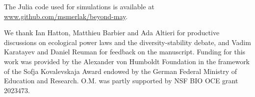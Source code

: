 \documentclass[
 prl,
 twocolumn,
 amsmath,
 amssymb,
 aps,
]{revtex4-2}
\begin{document}
\medskip

The Julia code used for simulations is available at \url{www.github.com/msmerlak/beyond-may}.

\medskip

\begin{acknowledgments}
We thank Ian Hatton, Matthieu Barbier and Ada Altieri for productive discussions on ecological power laws and the diversity-stability debate, and Vadim Karatayev and Daniel Reuman for feedback on the manuscript.
Funding for this work was provided by the Alexander von Humboldt Foundation in the framework of the Sofja Kovalevskaja Award endowed by the German Federal Ministry of Education and Research.
O.M. was partly supported by NSF BIO OCE grant 2023473.
\end{acknowledgments}

\medskip



\end{document}
